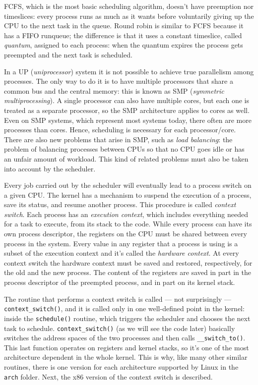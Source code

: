\documentclass[10pt]{book}
\begin{document}
FCFS, which is the most basic scheduling algorithm, doesn't have preemption nor timeslices: every process  runs as much as it wants before voluntarily giving up the CPU to the next task in the queue. Round robin is similar to FCFS because it has a FIFO runqueue; the difference is that it uses a constant timeslice, called \textit{quantum}, assigned to each process: when the quantum expires the process gets preempted and the next task is scheduled.

In a UP (\textit{uniprocessor}) system it is not possible to achieve true parallelism among processes. The only way to do it is to have multiple processors that share a common bus and the central memory: this is known as SMP (\textit{symmetric multiprocessing}). A single processor can also have multiple cores, but each one is treated as a separate processor, so the SMP architecture applies to cores as well. Even on SMP systems, which represent most systems today, there often are more processes than cores. Hence, scheduling is necessary for each processor/core. There are also new problems that arise in SMP, such as \textit{load balancing}: the problem of balancing processes between CPUs so that no CPU goes idle or has an unfair amount of workload. This kind of related problems must also be taken into account by the scheduler.

Every job carried out by the scheduler will eventually lead to a process switch on a given CPU. The kernel has a mechanism to suspend the execution of a process, save its status, and resume another process. This procedure is called \textit{context switch}. Each process has an \textit{execution context}, which includes everything needed for a task to execute, from its stack to the code. While every process can have its own process descriptor, the registers on the CPU must be shared between every process in the system. Every value in any register that a process is using is a subset of the execution context and it's called the \textit{hardware context}. At every context switch the hardware context must be saved and restored, respectively, for the old and the new process. The content of the registers are saved in part in the process descriptor of the preempted process, and in part on its kernel stack.

The routine that performs a context switch is called --- not surprisingly --- \verb|context_switch()|, and it is called only in one well-defined point in the kernel: inside the \verb|schedule()| routine, which triggers the scheduler and chooses the next task to schedule. \verb|context_switch()| (as we will see the code later) basically switches the address spaces of the two processes and then calls \verb|__switch_to()|. This last function operates on registers and kernel stacks, so it's one of the most architecture dependent in the whole kernel. This is why, like many other similar routines, there is one version for each architecture supported by Linux in the \verb|arch| folder. Next, the x86 version of the context switch is described.
\end{document}
